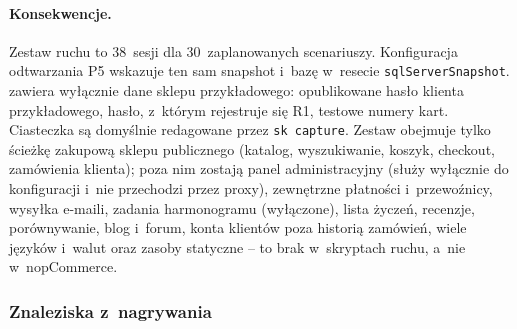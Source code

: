 \paragraph{Konsekwencje.} Zestaw ruchu to 38~sesji dla 30~zaplanowanych scenariuszy.
Konfiguracja odtwarzania P5 wskazuje ten sam snapshot i~bazę w~resecie
\texttt{sqlServerSnapshot}.  zawiera wyłącznie dane sklepu przykładowego:
opublikowane hasło klienta przykładowego, hasło, z~którym rejestruje się R1, testowe
numery kart. Ciasteczka są domyślnie redagowane przez \texttt{sk capture}. Zestaw
obejmuje tylko ścieżkę zakupową sklepu publicznego (katalog, wyszukiwanie, koszyk, checkout,
zamówienia klienta); poza nim zostają panel administracyjny (służy wyłącznie do konfiguracji
i~nie przechodzi przez proxy), zewnętrzne płatności i~przewoźnicy, wysyłka e-maili, zadania
harmonogramu (wyłączone), lista życzeń, recenzje, porównywanie, blog i~forum, konta klientów
poza historią zamówień, wiele języków i~walut oraz zasoby statyczne -- to brak w~skryptach
ruchu, a~nie w~nopCommerce.


\subsubsection{Znaleziska z~nagrywania}\label{sec:bench-ruch-znaleziska}

